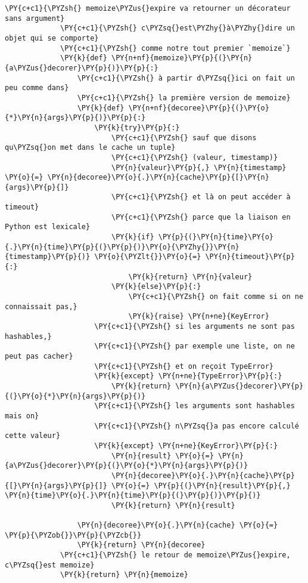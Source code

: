 \begin{Verbatim}[commandchars=\\\{\}]
             \PY{c+c1}{\PYZsh{} memoize\PYZus{}expire va retourner un décorateur sans argument}
             \PY{c+c1}{\PYZsh{} c\PYZsq{}est\PYZhy{}à\PYZhy{}dire un objet qui se comporte}
             \PY{c+c1}{\PYZsh{} comme notre tout premier `memoize`}
             \PY{k}{def} \PY{n+nf}{memoize}\PY{p}{(}\PY{n}{a\PYZus{}decorer}\PY{p}{)}\PY{p}{:}
                 \PY{c+c1}{\PYZsh{} à partir d\PYZsq{}ici on fait un peu comme dans}
                 \PY{c+c1}{\PYZsh{} la première version de memoize}
                 \PY{k}{def} \PY{n+nf}{decoree}\PY{p}{(}\PY{o}{*}\PY{n}{args}\PY{p}{)}\PY{p}{:}
                     \PY{k}{try}\PY{p}{:}
                         \PY{c+c1}{\PYZsh{} sauf que disons qu\PYZsq{}on met dans le cache un tuple}
                         \PY{c+c1}{\PYZsh{} (valeur, timestamp)}
                         \PY{n}{valeur}\PY{p}{,} \PY{n}{timestamp} \PY{o}{=} \PY{n}{decoree}\PY{o}{.}\PY{n}{cache}\PY{p}{[}\PY{n}{args}\PY{p}{]}
                         \PY{c+c1}{\PYZsh{} et là on peut accéder à timeout}
                         \PY{c+c1}{\PYZsh{} parce que la liaison en Python est lexicale}
                         \PY{k}{if} \PY{p}{(}\PY{n}{time}\PY{o}{.}\PY{n}{time}\PY{p}{(}\PY{p}{)}\PY{o}{\PYZhy{}}\PY{n}{timestamp}\PY{p}{)} \PY{o}{\PYZlt{}}\PY{o}{=} \PY{n}{timeout}\PY{p}{:}
                             \PY{k}{return} \PY{n}{valeur}
                         \PY{k}{else}\PY{p}{:}
                             \PY{c+c1}{\PYZsh{} on fait comme si on ne connaissait pas,}
                             \PY{k}{raise} \PY{n+ne}{KeyError}
                     \PY{c+c1}{\PYZsh{} si les arguments ne sont pas hashables,}
                     \PY{c+c1}{\PYZsh{} par exemple une liste, on ne peut pas cacher}
                     \PY{c+c1}{\PYZsh{} et on reçoit TypeError}
                     \PY{k}{except} \PY{n+ne}{TypeError}\PY{p}{:}
                         \PY{k}{return} \PY{n}{a\PYZus{}decorer}\PY{p}{(}\PY{o}{*}\PY{n}{args}\PY{p}{)}
                     \PY{c+c1}{\PYZsh{} les arguments sont hashables mais on}
                     \PY{c+c1}{\PYZsh{} n\PYZsq{}a pas encore calculé cette valeur}
                     \PY{k}{except} \PY{n+ne}{KeyError}\PY{p}{:}
                         \PY{n}{result} \PY{o}{=} \PY{n}{a\PYZus{}decorer}\PY{p}{(}\PY{o}{*}\PY{n}{args}\PY{p}{)}
                         \PY{n}{decoree}\PY{o}{.}\PY{n}{cache}\PY{p}{[}\PY{n}{args}\PY{p}{]} \PY{o}{=} \PY{p}{(}\PY{n}{result}\PY{p}{,} \PY{n}{time}\PY{o}{.}\PY{n}{time}\PY{p}{(}\PY{p}{)}\PY{p}{)}
                         \PY{k}{return} \PY{n}{result}
         
                 \PY{n}{decoree}\PY{o}{.}\PY{n}{cache} \PY{o}{=} \PY{p}{\PYZob{}}\PY{p}{\PYZcb{}}
                 \PY{k}{return} \PY{n}{decoree}
             \PY{c+c1}{\PYZsh{} le retour de memoize\PYZus{}expire, c\PYZsq{}est memoize}
             \PY{k}{return} \PY{n}{memoize}
\end{Verbatim}



